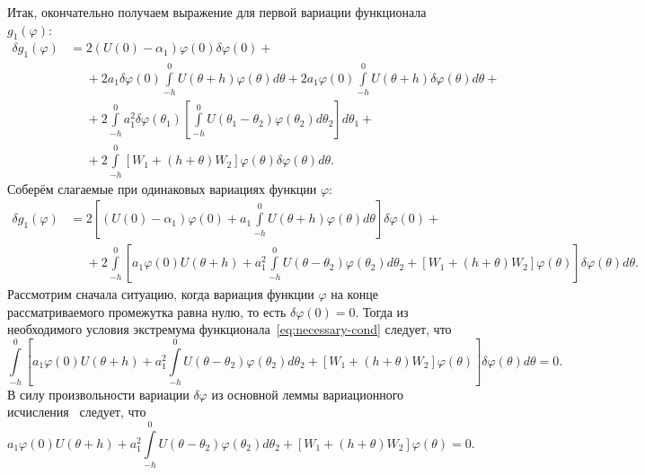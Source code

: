 \documentclass[a4paper,14pt]{article}
\theoremstyle{definition}
\begin{document}
Итак, окончательно получаем выражение для первой вариации функционала $g_1(\varphi)$:
\begin{equation*}
  \begin{aligned}
    \delta g_1(\varphi)
    &=
      2 \left( U(0) - \alpha_1 \right) \varphi(0) \delta \varphi(0)
      + \\
    &\phantom{=}
      +
      2 a_1 \delta\varphi(0)
      \int\limits_{-h}^{0} U(\theta + h) \varphi(\theta) d\theta
      +
      2 a_1 \varphi(0)
      \int\limits_{-h}^{0} U(\theta + h) \delta\varphi(\theta) d\theta
      + \\
    &\phantom{=}
      +
      2
      \int\limits_{-h}^{0} a_1^2 \delta \varphi(\theta_1)
      \left[
      \int\limits_{-h}^{0}
      U(\theta_1 - \theta_2) \varphi(\theta_2)
      d\theta_2
      \right]
      d\theta_1
      + \\
    &\phantom{=}
      +
      2 \int\limits_{-h}^{0}
      \left[ W_1 + (h + \theta) W_2 \right] \varphi(\theta) \delta \varphi(\theta)
      d\theta.
  \end{aligned}
\end{equation*}
Соберём слагаемые при одинаковых вариациях функции $\varphi$:
\begin{equation*}
  \begin{aligned}
    \delta g_1(\varphi)
    &=
      2
      \left[
      \left( U(0) - \alpha_1 \right) \varphi(0)
      +
      a_1
      \int\limits_{-h}^{0} U(\theta + h) \varphi(\theta) d\theta
      \right] \delta \varphi(0)
      + \\
    &\phantom{=}
      +
      2
      \int\limits_{-h}^{0}
      \left[
      a_1 \varphi(0)
      U(\theta + h)
      +
      a_1^2
      \int\limits_{-h}^{0}
      U(\theta - \theta_2) \varphi(\theta_2)
      d\theta_2
      +
      \left[ W_1 + (h + \theta) W_2 \right] \varphi(\theta)
      \right]
      \delta \varphi(\theta)
      d\theta.
  \end{aligned}
\end{equation*}
Рассмотрим сначала ситуацию, когда вариация функции $\varphi$ на конце
рассматриваемого промежутка равна нулю, то есть $\delta \varphi(0) = 0$.
Тогда из необходимого условия экстремума функционала~\eqref{eq:necessary-cond}
следует, что
\begin{equation*}
  \int\limits_{-h}^{0}
  \left[
    a_1 \varphi(0)
    U(\theta + h)
    +
    a_1^2
    \int\limits_{-h}^{0}
    U(\theta - \theta_2) \varphi(\theta_2)
    d\theta_2
    +
    \left[ W_1 + (h + \theta) W_2 \right] \varphi(\theta)
  \right]
  \delta \varphi(\theta)
  d\theta
  = 0.
\end{equation*}
В силу произвольности вариации $\delta \varphi$ из основной леммы
вариационного исчисления~\cite[стр.~295]{elsgolc1969} следует,
что
\begin{equation*}
  a_1 \varphi(0)
  U(\theta + h)
  +
  a_1^2
  \int\limits_{-h}^{0}
  U(\theta - \theta_2) \varphi(\theta_2)
  d\theta_2
  +
  \left[ W_1 + (h + \theta) W_2 \right] \varphi(\theta)
  = 0.
\end{equation*}
\end{document}
